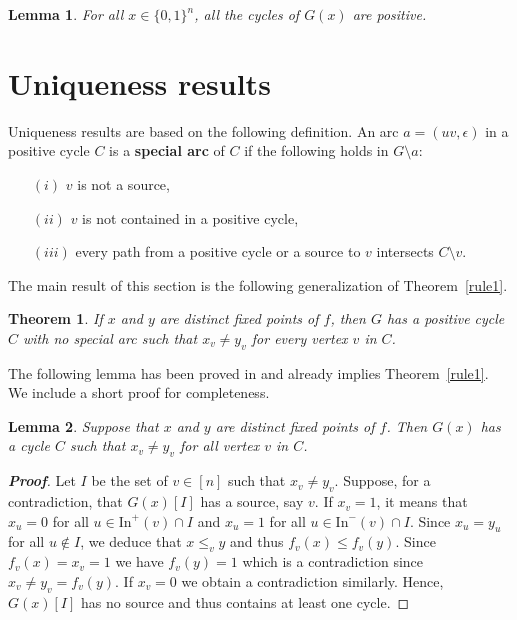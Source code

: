 \documentclass[11pt,a4paper]{article}
\newtheorem{lemma}{Lemma}
\newtheorem{theorem}{Theorem}
\def\B{\{0,1\}}
\def\In{\mathrm{In}}
\def\e{\epsilon}
\begin{document}
\begin{lemma}
For all $x\in\B^n$, all the cycles of $G(x)$ are positive.
\end{lemma}

\section{Uniqueness results}\label{sec:uniqueness}


Uniqueness results are based on the following definition. An arc $a=(uv,\e)$ in a positive cycle $C$ is a {\bf special arc} of $C$ if the following holds in  $G\setminus a$:
\begin{itemize}
\item[$(i)$] $v$ is not a source,
\item[$(ii)$] $v$ is not contained in a positive cycle,
\item[$(iii)$] every path from a positive cycle or a source to $v$ intersects $C\setminus v$.
\end{itemize} 

The main result of this section is the following generalization of Theorem~\ref{rule1}. 

\begin{theorem}\label{uniqueness}
If $x$ and $y$ are distinct fixed points of $f$, then $G$ has a positive cycle $C$ with no special arc such that $x_v\neq y_v$ for every vertex $v$ in $C$. 
\end{theorem}


The following lemma has been proved in \cite[Theorem 9]{A08} and already implies Theorem~\ref{rule1}. We include a short proof for completeness.  

\begin{lemma}\label{alphabeta_lemma}
Suppose that $x$ and $y$ are distinct fixed points of $f$. Then $G(x)$ has a cycle $C$ such that $x_v\neq y_v$ for all vertex $v$ in $C$. 
\end{lemma}


\begin{proof}[{\bf Proof}]
Let $I$ be the set of $v\in[n]$ such that $x_v\neq y_v$. Suppose, for a contradiction, that $G(x)[I]$ has a source, say $v$. If $x_v=1$, it means that $x_u=0$ for all $u\in \In^+(v)\cap I$ and $x_u=1$ for all $u\in \In^-(v)\cap I$. Since $x_u=y_u$ for all $u\not\in I$, we deduce that $x\leq_v y$ and thus $f_v(x)\leq f_v(y)$. Since $f_v(x)=x_v=1$ we have $f_v(y)=1$ which is a contradiction since $x_v\neq y_v=f_v(y)$. If $x_v=0$ we obtain a contradiction similarly. Hence, $G(x)[I]$ has no source and thus contains at least one cycle. 
\end{proof}
\end{document}
